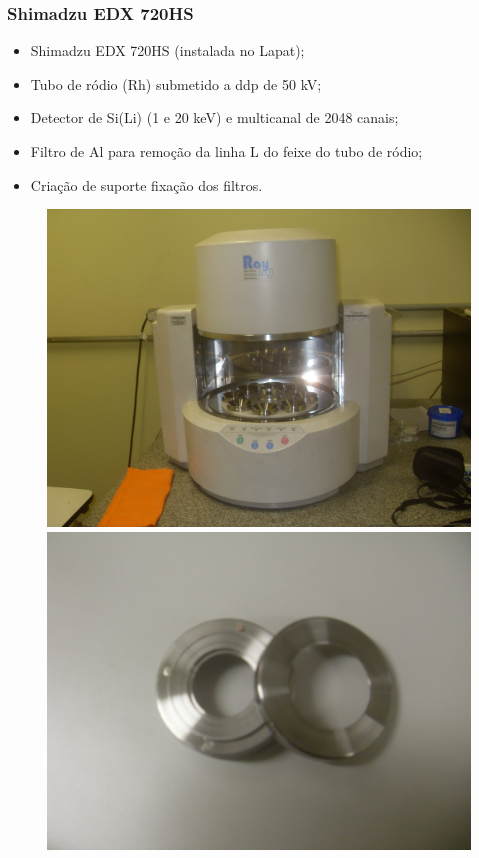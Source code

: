 \begin{frame}
	\frametitle{Shimadzu EDX 720HS}
	\begin{itemize}
		\item Shimadzu EDX 720HS (instalada no Lapat);
		\item Tubo de ródio (Rh) submetido a ddp de 50 kV;
		\item Detector de Si(Li) (1 e 20 keV) e multicanal de 2048 canais;
		\item Filtro de Al para remoção da linha L do feixe do tubo de ródio;
		\item Criação de suporte fixação dos filtros. 
	\end{itemize}
	\begin{figure}[H]
		\centering
		\includegraphics[width=0.4\linewidth]{../../inputs/images/xrf-ed-IAG-USP.jpg}
		\hspace{0.4cm}
		  \includegraphics[width=0.4\linewidth]{../../inputs/images/suporte8.jpg}
	\end{figure}
\end{frame}

